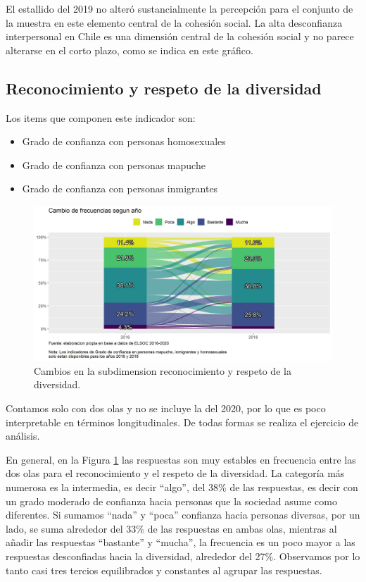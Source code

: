 \documentclass[
  12pt,
]{book}
\begin{document}
El estallido del 2019 no alteró sustancialmente la percepción para el conjunto de la muestra en este elemento central de la cohesión social. La alta desconfianza interpersonal en Chile es una dimensión central de la cohesión social y no parece alterarse en el corto plazo, como se indica en este gráfico.

\hypertarget{reconocimiento-y-respeto-de-la-diversidad}{%
\subsection{Reconocimiento y respeto de la diversidad}\label{reconocimiento-y-respeto-de-la-diversidad}}

Los items que componen este indicador son:

\begin{itemize}
\item
  Grado de confianza con personas homosexuales
\item
  Grado de confianza con personas mapuche
\item
  Grado de confianza con personas inmigrantes
\end{itemize}

\begin{figure}[H]

{\centering \includegraphics[width=1\linewidth,height=1\textheight]{output/graphs/alluvial_diversidad} 

}

\caption{Cambios en la subdimension reconocimiento y respeto de la diversidad.}\label{fig:alluvial-diversidad}
\end{figure}

Contamos solo con dos olas y no se incluye la del 2020, por lo que es poco interpretable en términos longitudinales. De todas formas se realiza el ejercicio de análisis.

En general, en la Figura \ref{fig:alluvial-diversidad} las respuestas son muy estables en frecuencia entre las dos olas para el reconocimiento y el respeto de la diversidad. La categoría más numerosa es la intermedia, es decir ``algo'', del 38\% de las respuestas, es decir con un grado moderado de confianza hacia personas que la sociedad asume como diferentes. Si sumamos ``nada'' y ``poca'' confianza hacia personas diversas, por un lado, se suma alrededor del 33\% de las respuestas en ambas olas, mientras al añadir las respuestas ``bastante'' y ``mucha'', la frecuencia es un poco mayor a las respuestas desconfiadas hacia la diversidad, alrededor del 27\%. Observamos por lo tanto casi tres tercios equilibrados y constantes al agrupar las respuestas.
\end{document}

